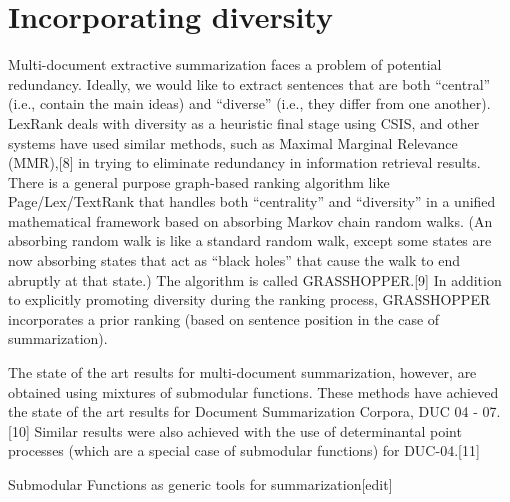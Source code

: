\documentclass[12pt]{article}
\begin{document}
\section{Incorporating diversity}


Multi-document extractive summarization faces a problem of potential redundancy.
Ideally, we would like to extract sentences that are both ``central'' (i.e., contain the main ideas) and ``diverse'' (i.e., they differ from one another).
LexRank deals with diversity as a heuristic final stage using CSIS, and other systems have used similar methods, such as Maximal Marginal Relevance (MMR),[8] in trying to eliminate redundancy in information retrieval results.
There is a general purpose graph-based ranking algorithm like Page/Lex/TextRank that handles both ``centrality'' and ``diversity'' in a unified mathematical framework based on absorbing Markov chain random walks. (An absorbing random walk is like a standard random walk, except some states are now absorbing states that act as ``black holes'' that cause the walk to end abruptly at that state.)
The algorithm is called GRASSHOPPER.[9]
In addition to explicitly promoting diversity during the ranking process, GRASSHOPPER incorporates a prior ranking (based on sentence position in the case of summarization).

The state of the art results for multi-document summarization, however, are obtained using mixtures of submodular functions. These methods have achieved the state of the art results for Document Summarization Corpora, DUC 04 - 07.[10] Similar results were also achieved with the use of determinantal point processes (which are a special case of submodular functions) for DUC-04.[11]

Submodular Functions as generic tools for summarization[edit]


%
%
\end{document}

